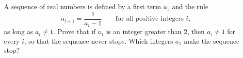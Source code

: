 A sequence of real numbers is defined by a first term $a_1$ and the rule
\[a_{i+1}=\dfrac{1}{a_i-1}\qquad\text{for all positive integers }i,\]
as long as $a_i\ne1$. Prove that if $a_1$ is an integer greater than $2$, then $a_i\ne1$ for every $i$, so that the sequence never stops. Which integers $a_1$ make the sequence stop?

